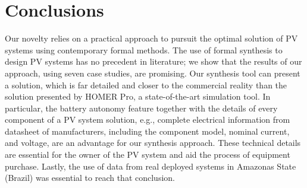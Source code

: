 \documentclass[runningheads]{llncs}
\begin{document}
\section{Conclusions} 

Our novelty relies on a practical approach to pursuit the optimal solution of PV systems using contemporary formal methods. The use of formal synthesis to design PV systems has no precedent in literature; we show that the results of our approach, using seven case studies, are promising. Our synthesis tool can present a solution, which is far detailed and closer to the commercial reality than the solution presented by HOMER Pro, a state-of-the-art simulation tool. In particular, the battery autonomy feature together with the details of every component of a PV system solution, e.g., complete electrical information from datasheet of manufacturers, including the component model, nominal current, and voltage, are an advantage for our synthesis approach. These technical details are essential for the owner of the PV system and aid the process of equipment purchase. Lastly, the use of data from real deployed systems in Amazonas State (Brazil) was essential to reach that conclusion.

%
%


%
\end{document}
